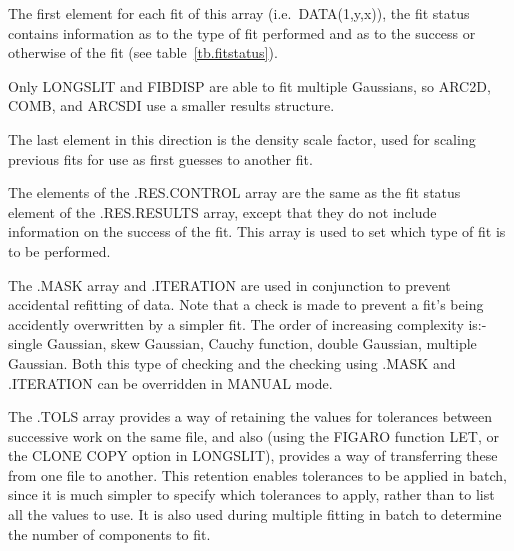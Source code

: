 The first element for each fit of this array (i.e.\ DATA(1,y,x)), the
fit status contains information as to the type of fit performed and as
to the success or otherwise of the fit (see table~\ref{tb.fitstatus}).

Only LONGSLIT and FIBDISP are able to fit multiple Gaussians, so ARC2D,
COMB, and ARCSDI use a smaller results structure.

The last element in this direction is the density scale factor, used for
scaling previous fits for use as first guesses to another fit.

The elements of the .RES.CONTROL array are the same as the fit
status element of the .RES.RESULTS array, except that they do not
include information on the success of the fit.
This array is used to set which type of fit is to be performed.

The .MASK array and .ITERATION are used in conjunction to prevent
accidental refitting of data.
Note that a check is made to prevent a fit's being accidently
overwritten by a simpler fit.
The order of increasing complexity is:- single Gaussian, skew
Gaussian, Cauchy function, double Gaussian, multiple Gaussian.
Both this type of checking and the checking using .MASK and .ITERATION
can be overridden in MANUAL mode.

The .TOLS array provides a way of retaining the values for tolerances
between successive work on the same file, and also (using the FIGARO
function LET, or the CLONE COPY option in LONGSLIT), provides a way of
transferring these from one file to another.
This retention enables tolerances to be applied in batch, since it is
much simpler to specify which tolerances to apply, rather than to list
all the values to use.
It is also used during multiple fitting in batch to determine the number
of components to fit.

